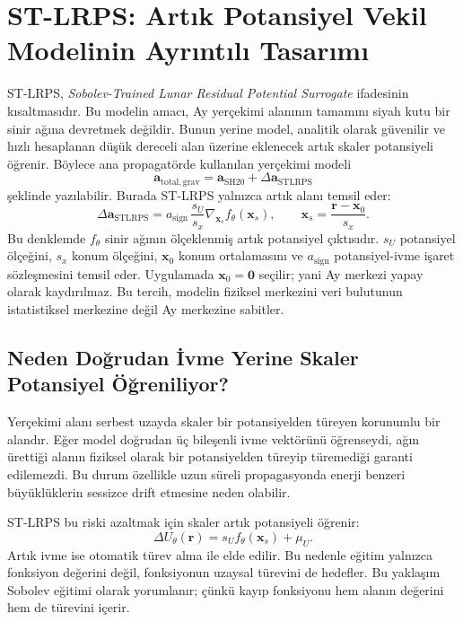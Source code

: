 \section{ST-LRPS: Artık Potansiyel Vekil Modelinin Ayrıntılı Tasarımı}
\label{sec:st_lrps_detailed_design}

ST-LRPS, \textit{Sobolev-Trained Lunar Residual Potential Surrogate} ifadesinin kısaltmasıdır. Bu modelin amacı, Ay yerçekimi alanının tamamını siyah kutu bir sinir ağına devretmek değildir. Bunun yerine model, analitik olarak güvenilir ve hızlı hesaplanan düşük dereceli alan üzerine eklenecek artık skaler potansiyeli öğrenir. Böylece ana propagatörde kullanılan yerçekimi modeli
\[
\mathbf{a}_{\mathrm{total,grav}}
=
\mathbf{a}_{\mathrm{SH20}}
+ \Delta\mathbf{a}_{\mathrm{STLRPS}}
\]
şeklinde yazılabilir. Burada ST-LRPS yalnızca artık alanı temsil eder:
\[
\Delta\mathbf{a}_{\mathrm{STLRPS}}
=
a_{\mathrm{sign}}\,
\frac{s_U}{s_x}
\nabla_{\mathbf{x}_{s}} f_{\theta}(\mathbf{x}_{s}),
\qquad
\mathbf{x}_{s}=\frac{\mathbf{r}-\mathbf{x}_{0}}{s_x}.
\]
Bu denklemde \(f_{\theta}\) sinir ağının ölçeklenmiş artık potansiyel çıktısıdır. \(s_U\) potansiyel ölçeğini, \(s_x\) konum ölçeğini, \(\mathbf{x}_{0}\) konum ortalamasını ve \(a_{\mathrm{sign}}\) potansiyel-ivme işaret sözleşmesini temsil eder. Uygulamada \(\mathbf{x}_{0}=\mathbf{0}\) seçilir; yani Ay merkezi yapay olarak kaydırılmaz. Bu tercih, modelin fiziksel merkezini veri bulutunun istatistiksel merkezine değil Ay merkezine sabitler.

\subsection{Neden Doğrudan İvme Yerine Skaler Potansiyel Öğreniliyor?}

Yerçekimi alanı serbest uzayda skaler bir potansiyelden türeyen korunumlu bir alandır. Eğer model doğrudan üç bileşenli ivme vektörünü öğrenseydi, ağın ürettiği alanın fiziksel olarak bir potansiyelden türeyip türemediği garanti edilemezdi. Bu durum özellikle uzun süreli propagasyonda enerji benzeri büyüklüklerin sessizce drift etmesine neden olabilir.

ST-LRPS bu riski azaltmak için skaler artık potansiyeli öğrenir:
\[
\Delta U_{\theta}(\mathbf{r}) = s_U f_{\theta}(\mathbf{x}_{s}) + \mu_U.
\]
Artık ivme ise otomatik türev alma ile elde edilir. Bu nedenle eğitim yalnızca fonksiyon değerini değil, fonksiyonun uzaysal türevini de hedefler. Bu yaklaşım Sobolev eğitimi olarak yorumlanır; çünkü kayıp fonksiyonu hem alanın değerini hem de türevini içerir.

